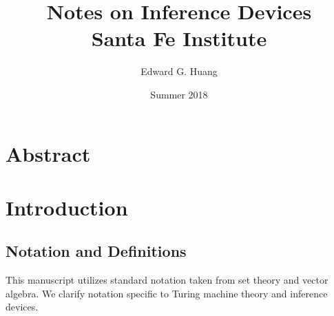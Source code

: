 \documentclass[11pt]{article}
\title{
  Notes on Inference Devices \\
  \bigskip
  \large Santa Fe Institute}
\author{Edward G. Huang}
\date{Summer 2018}
\begin{document}
\maketitle 


\section{Abstract} 

 

\section{Introduction} 

\subsection{Notation and Definitions}
This manuscript utilizes standard notation taken from set theory and vector algebra. We clarify notation specific to Turing machine theory and inference devices. \\
\end{document}
